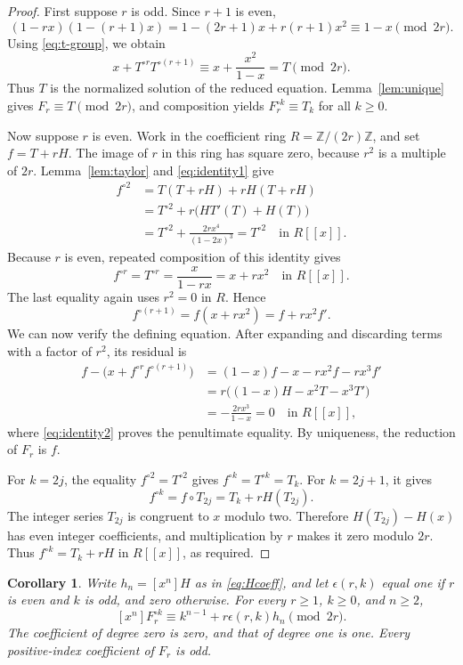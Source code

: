 \documentclass[11pt,a4paper]{article}
\newtheorem{corollary}[theorem]{Corollary}
\theoremstyle{remark}\newtheorem{remark}[theorem]{Remark}
\newcommand{\Z}{\mathbb Z}
\newcommand{\coeff}[2]{[x^{#1}]#2}
\begin{document}
\begin{proof}
First suppose $r$ is odd. Since $r+1$ is even,
\[
(1-rx)(1-(r+1)x)
=1-(2r+1)x+r(r+1)x^2\equiv1-x\pmod{2r}.
\]
Using \eqref{eq:t-group}, we obtain
\[
x+T^{\circ r}T^{\circ(r+1)}
\equiv x+\frac{x^2}{1-x}=T\pmod{2r}.
\]
Thus $T$ is the normalized solution of the reduced equation.
Lemma~\ref{lem:unique} gives $F_r\equiv T\pmod{2r}$, and
composition yields $F_r^{\circ k}\equiv T_k$ for all $k\ge0$.

Now suppose $r$ is even. Work in the coefficient ring
$R=\Z/(2r)\Z$, and set $f=T+rH$. The image of $r$ in this ring
has square zero, because $r^2$ is a multiple of $2r$.
Lemma~\ref{lem:taylor} and \eqref{eq:identity1} give
\begin{align*}
f^{\circ2}
&=T(T+rH)+rH(T+rH)\\
&=T^{\circ2}+r\bigl(HT'(T)+H(T)\bigr)\\
&=T^{\circ2}+\frac{2rx^4}{(1-2x)^3}
=T^{\circ2}\quad\text{in }R[[x]].
\end{align*}
Because $r$ is even, repeated composition of this identity gives
\[
f^{\circ r}=T^{\circ r}=\frac{x}{1-rx}=x+rx^2
\quad\text{in }R[[x]].
\]
The last equality again uses $r^2=0$ in $R$. Hence
\[
f^{\circ(r+1)}=f(x+rx^2)=f+rx^2f'.
\]
We can now verify the defining equation. After expanding and discarding
terms with a factor of $r^2$, its residual is
\begin{align*}
f-\bigl(x+f^{\circ r}f^{\circ(r+1)}\bigr)
&=(1-x)f-x-rx^2f-rx^3f'\\
&=r\bigl((1-x)H-x^2T-x^3T'\bigr)\\
&=-\frac{2rx^3}{1-x}=0\quad\text{in }R[[x]],
\end{align*}
where \eqref{eq:identity2} proves the penultimate equality.
By uniqueness, the reduction of $F_r$ is $f$.

For $k=2j$, the equality $f^{\circ2}=T^{\circ2}$ gives
$f^{\circ k}=T^{\circ k}=T_k$. For $k=2j+1$, it gives
\[
f^{\circ k}=f\circ T_{2j}=T_k+rH(T_{2j}).
\]
The integer series $T_{2j}$ is congruent to $x$ modulo two.
Therefore $H(T_{2j})-H(x)$ has even integer coefficients, and
multiplication by $r$ makes it zero modulo $2r$. Thus
$f^{\circ k}=T_k+rH$ in $R[[x]]$, as required.
\end{proof}

\begin{corollary}\label{cor:coeff}
Write $h_n=\coeff{n}{H}$ as in \eqref{eq:Hcoeff}, and let
$\epsilon(r,k)$ equal one if $r$ is even and $k$ is odd, and zero
otherwise. For every $r\ge1$, $k\ge0$, and $n\ge2$,
\[
\coeff{n}{F_r^{\circ k}}
\equiv k^{n-1}+r\epsilon(r,k)h_n\pmod{2r}.
\]
The coefficient of degree zero is zero, and that of degree one is one.
Every positive-index coefficient of $F_r$ is odd.
\end{corollary}
\end{document}
